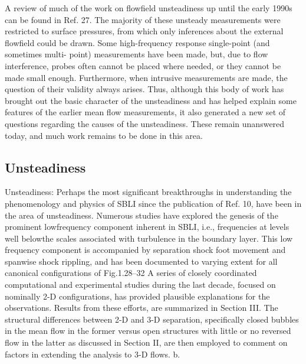 A review of much of the work on flowfield unsteadiness up until the early 1990s can be found in Ref. 27. The majority of these unsteady measurements were restricted to surface pressures, from which only inferences about the external flowfield could be drawn. Some high-frequency response single-point (and sometimes multi- point) measurements have been made, but, due to flow interference, probes often cannot be placed where needed, or they cannot be made small enough. Furthermore, when intrusive measurements are made, the question of their validity always arises. Thus, although this body of work has brought out the basic character of the unsteadiness and has helped explain some features of the earlier mean flow measurements, it also generated a new set of questions regarding the causes of the unsteadiness. These remain unanswered today, and much work remains to be done in this area.

\subsection{Unsteadiness}

Unsteadiness: Perhaps the most significant breakthroughs in understanding the phenomenology and physics of SBLI since the publication of Ref. 10, have been in the area of unsteadiness. Numerous studies have explored the genesis of the prominent lowfrequency component inherent in SBLI, i.e., frequencies at levels well belowthe scales associated with turbulence in the boundary layer. This low frequency component is accompanied by separation shock foot movement and spanwise shock rippling, and has been documented to varying extent for all canonical configurations of Fig.1.28–32 A series of closely coordinated computational and experimental studies during the last decade, focused on nominally 2-D configurations, has provided plausible explanations for the observations. Results from these efforts, are summarized in Section III. The structural differences between 2-D and 3-D separation, specifically closed bubbles in the mean flow in the former versus open structures with little or no reversed flow in the latter as discussed in Section II, are then employed to comment on factors in extending the analysis to 3-D flows.
b. \cite{Gaitonde2013}

